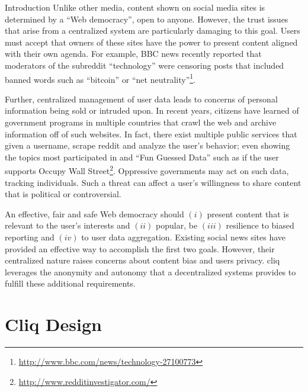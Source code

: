 \documentclass{sig-alternate}
\begin{document}
\begin{section}{Introduction}
Unlike other media, content shown on social media sites is determined by a ``Web democracy'', 
open to anyone. However, the trust issues that arise from a centralized system are particularly 
damaging to this goal. Users must accept that owners of these sites have the power to present 
content aligned with their own agenda. For example, BBC news recently reported that moderators 
of the subreddit ``technology'' were censoring posts that included banned words such as ``bitcoin'' 
or ``net neutrality''\footnote{\url{http://www.bbc.com/news/technology-27100773}}.

Further, centralized management of user data leads to concerns of personal information being 
sold or intruded upon. In recent years, citizens have learned of government programs in multiple 
countries that crawl the web and archive information off of such websites. In fact, there exist 
multiple public services that given a username, scrape reddit and analyze the user's behavior; even 
showing the topics most participated in and ``Fun Guessed Data'' such as if the user supports
Occupy Wall Street\footnote{\url{http://www.redditinvestigator.com/}}. Oppressive governments may 
act on such data, tracking individuals. Such a threat can affect a user's willingness to share content 
that is political or controversial. 

An effective, fair and safe Web democracy should $(i)$ present content
that is relevant to the user's interests and $(ii)$ popular, be
$(iii)$ resilience to biased reporting and $(iv)$ to user data
aggregation. Existing social news sites have provided an effective way
to accomplish the first two goals. However, their centralized nature
raises concerns about content bias and users privacy.  cliq leverages
the anonymity and autonomy that a decentralized systems provides to
fulfill these additional requirements.
\end{section}

\section{Cliq Design}
\end{document}
